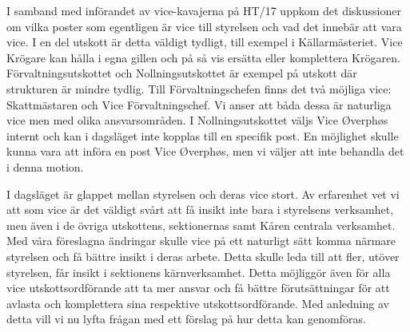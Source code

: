 \documentclass[../_main/handlingar.tex]{subfiles}
\begin{document}

\def\postarvice{Denna post är en vice till utskottsordföranden.}
\newcommand{\laggatillpostarvice}[2]{
\att i reglementet, under #1, under ``#2'', lägga till
\begin{dashlist}
    \item \postarvice
\end{dashlist}
}

I samband med införandet av vice-kavajerna på HT/17 uppkom det diskussioner om vilka poster som egentligen är vice till styrelsen och vad det innebär att vara vice. I en del utskott är detta väldigt tydligt, till exempel i Källarmästeriet. Vice Krögare kan hålla i egna gillen och på så vis ersätta eller komplettera Krögaren. Förvaltningsutskottet och Nollningsutskottet är exempel på utskott där strukturen är mindre tydlig. Till Förvaltningschefen finns det två möjliga vice: Skattmästaren och Vice Förvaltningschef. Vi anser att båda dessa är naturliga vice men med olika ansvarsområden. I Nollningsutskottet väljs Vice Øverphøs internt och kan i dagsläget inte kopplas till en specifik post. En möjlighet skulle kunna vara att införa en post Vice Øverphøs, men vi väljer att inte behandla det i denna motion.

I dagsläget är glappet mellan styrelsen och deras vice stort. Av erfarenhet vet vi att som vice är det väldigt svårt att få insikt inte bara i styrelsens verksamhet, men även i de övriga utskottens, sektionernas samt Kåren centrala verksamhet. Med våra föreslagna ändringar skulle vice på ett naturligt sätt komma närmare styrelsen och få bättre insikt i deras arbete. Detta skulle leda till att fler, utöver styrelsen, får insikt i sektionens kärnverksamhet. Detta möjliggör även för alla vice utskottsordförande att ta mer ansvar och få bättre förutsättningar för att avlasta och komplettera sina respektive utskottsordförande. Med anledning av detta vill vi nu lyfta frågan med ett förslag på hur detta kan genomföras.

\newpage
\end{document}
